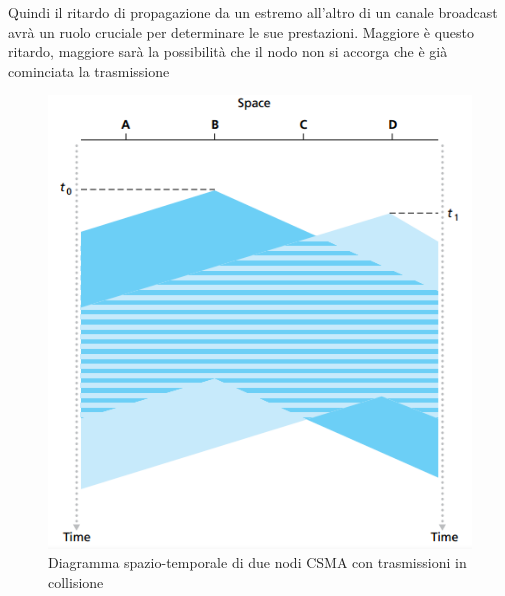\documentclass[11pt,a4paper]{book}
\begin{document}
Quindi il ritardo di propagazione da un estremo all'altro di un canale broadcast avrà un ruolo cruciale per determinare le sue prestazioni. Maggiore è questo ritardo, maggiore sarà la possibilità che il nodo non si accorga che è già cominciata la trasmissione
\begin{figure}
	\begin{center}
		\includegraphics[scale=0.6]{img/080.png}
		\caption{Diagramma spazio-temporale di due nodi CSMA con trasmissioni in collisione}
		\label{fig: 080}
	\end{center}
\end{figure}
\end{document}
